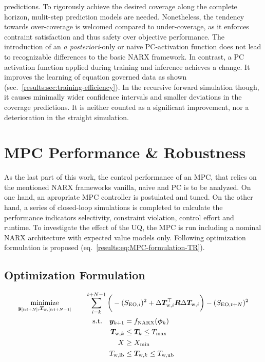 predictions.
To rigorously achieve the desired coverage along the complete horizon, mulit-step prediction models are needed.
\newline
\newline
Nonetheless, the tendency towards over-coverage is welcomed compared to under-coverage,
as it enforces contraint satisfaction and thus safety over objective performance.  
The introduction of an \emph{a posteriori}-only or naive
PC-activation function does not lead to recognizable differences to the basic NARX framework. 
In contrast, a PC activation function applied during training and inference
achieves a change. It improves the learning of equation governed data as shown (sec.~\ref{results:sec:training-efficiency}). 
In the recursive forward simulation though, it causes minimally wider confidence intervals and
smaller deviations in the coverage predictions. It is neither counted as a significant improvement, nor a
deterioration in the straight simulation.

\section{MPC Performance \& Robustness}
\label{MPC-Performance-and-Robustness}

As the last part of this work, the control performance of an MPC, that relies on the mentioned
NARX frameworks vanilla, naive and PC is to be analyzed.
On one hand, an apropriate MPC controller is postulated and tuned.
On the other hand, a series of closed-loop simulations is completed to calculate the
performance indicators selectivity, constraint violation, control effort and runtime.
To investigate the effect of the UQ, the MPC is run including a
nominal NARX architecture with expected value models only.
Following optimization formulation is proposed (eq.~\ref{results:eq:MPC-formulation-TR}).

\newpage
\subsection{Optimization Formulation}

\begin{equation}
    \label{results:eq:MPC-formulation-TR}
    \begin{gathered}
        \underset{{\bm{y}}_{ \left[t:t+N\right]},\bm{T}_{\text{w},[t:t+N-1]}}{\mathrm{minimize}}\quad \quad  \sum^{t+N-1}_{i=k} \bigg ( -(S_{\text{EO},i})^2
        + \Delta \bm{T}_{\text{w},i}^\top \bm{R} \Delta \bm{T}_{\text{w},i} \bigg )
        - (S_{\text{EO},t+N})^2
        \\
        \begin{aligned}
            \text{s.t.} \quad  \bm{y}_{k+1} &= f_{\text{NARX}}(\bm{\phi}_k) \\
            \bm{T}_{\text{w},k} &\leq \bm{T}_k \leq T_\text{max} \\
            X &\geq X_\text{min} \\
            T_{\text{w,lb}} &\leq \bm{T}_{\text{w},k} \leq T_{\text{w,ub}}
        \end{aligned}
    \end{gathered}
\end{equation}

